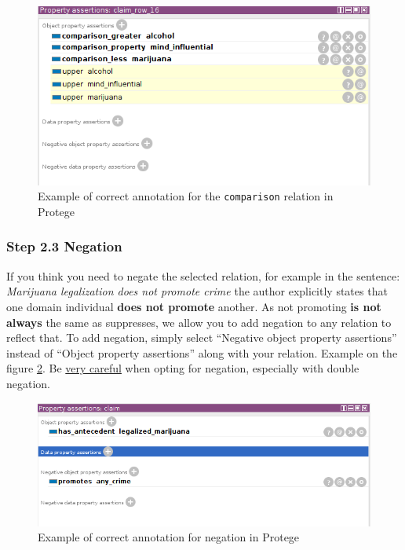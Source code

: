 \begin{figure}
	\includegraphics[scale=0.7]{comparison.png}
	\caption{Example of correct annotation for the \texttt{comparison} relation in Protege}
	\label{fig:comparison_example}
\end{figure}

\subsubsection{Step 2.3 Negation}

If you think you need to negate the selected relation, for example in the
sentence: \textit{Marijuana legalization does not promote crime} the author explicitly
states that one domain individual \textbf{does not promote} another. As not promoting \textbf{is
not always} the same as suppresses, we allow you to add negation to any
relation to reflect that. To add negation, simply select ``Negative object
property assertions'' instead of ``Object property assertions'' along with your
relation. Example on the figure \ref{fig:negation_example}. Be \underline{very careful}
when opting for negation, especially with double negation.

\begin{figure}
	\includegraphics[scale=0.7]{negation.png}
	\caption{Example of correct annotation for negation in Protege}
	\label{fig:negation_example}
\end{figure}

